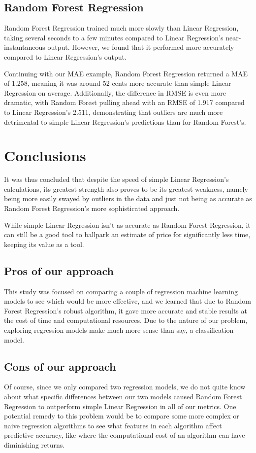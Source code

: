 \documentclass[conference]{IEEEtran}
\begin{document}
\subsection{Random Forest Regression}
Random Forest Regression trained much more slowly than Linear Regression, taking several seconds to a few minutes compared to Linear Regression's near-instantaneous output. However, we found that it performed more accurately compared to Linear Regression's output.

Continuing with our MAE example, Random Forest Regression returned a MAE of 1.258, meaning it was around 52 cents more accurate than simple Linear Regression on average. Additionally, the difference in RMSE is even more dramatic, with Random Forest pulling ahead with an RMSE of 1.917 compared to Linear Regression's 2.511, demonstrating that outliers are much more detrimental to simple Linear Regression's predictions than for Random Forest's.

\section{Conclusions}
It was thus concluded that despite the speed of simple Linear Regression's calculations, its greatest strength also proves to be its greatest weakness, namely being more easily swayed by outliers in the data and just not being as accurate as Random Forest Regression's more sophisticated approach.

While simple Linear Regression isn't as accurate as Random Forest Regression, it can still be a good tool to ballpark an estimate of price for significantly less time, keeping its value as a tool.

\subsection{Pros of our approach}
This study was focused on comparing a couple of regression machine learning models to see which would be more effective, and we learned that due to Random Forest Regression's robust algorithm, it gave more accurate and stable results at the cost of time and computational resources. Due to the nature of our problem, exploring regression models make much more sense than say, a classification model.

\subsection{Cons of our approach}
Of course, since we only compared two regression models, we do not quite know about what specific differences between our two models caused Random Forest Regression to outperform simple Linear Regression in all of our metrics. One potential remedy to this problem would be to compare some more complex or naive regression algorithms to see what features in each algorithm affect predictive accuracy, like where the computational cost of an algorithm can have diminishing returns.
\end{document}
